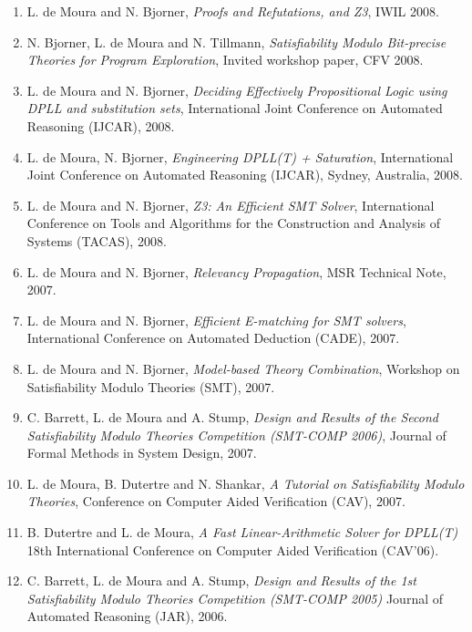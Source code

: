 \documentclass{article}
\begin{document}
\begin{enumerate}
\item L. de Moura and  N. Bjorner,
{\em Proofs and Refutations, and Z3},
IWIL 2008.

\item N. Bjorner, L. de Moura and N. Tillmann,
{\em Satisfiability Modulo Bit-precise Theories for Program Exploration},
Invited workshop paper, CFV 2008.

\item L. de Moura and N. Bjorner,
{\em Deciding Effectively Propositional Logic using DPLL and substitution sets},
International Joint Conference on Automated Reasoning (IJCAR), 2008.

\item L. de Moura, N. Bjorner,
{\em Engineering DPLL(T) + Saturation},
International Joint Conference on Automated Reasoning (IJCAR), Sydney, Australia, 2008.

\item L. de Moura and N. Bjorner,
{\em Z3: An Efficient SMT Solver},
International Conference on Tools and Algorithms for the Construction and Analysis of Systems (TACAS), 2008.

\item L. de Moura and N. Bjorner, {\em Relevancy Propagation}, MSR Technical Note, 2007.

\item L. de Moura and N. Bjorner, {\em Efficient E-matching for SMT solvers}, International Conference on Automated Deduction (CADE), 2007.

\item L. de Moura and N. Bjorner, {\em Model-based Theory Combination}, Workshop on Satisfiability Modulo Theories (SMT), 2007.

\item C. Barrett, L. de Moura and A. Stump,
{\em Design and Results of the Second Satisfiability Modulo Theories Competition (SMT-COMP 2006)}, Journal of Formal Methods in System Design, 2007.

\item L. de Moura, B. Dutertre and N. Shankar,
{\em A Tutorial on Satisfiability Modulo Theories}, Conference on Computer Aided Verification (CAV), 2007.

\item B. Dutertre and L. de Moura,
{\em A Fast Linear-Arithmetic Solver for DPLL(T)}
18th International Conference on Computer Aided Verification (CAV'06).

\item C. Barrett, L. de Moura and A. Stump,
{\em Design and Results of the 1st Satisfiability Modulo Theories Competition (SMT-COMP 2005)}
Journal of Automated Reasoning (JAR), 2006.


\end{enumerate}
\end{document}
